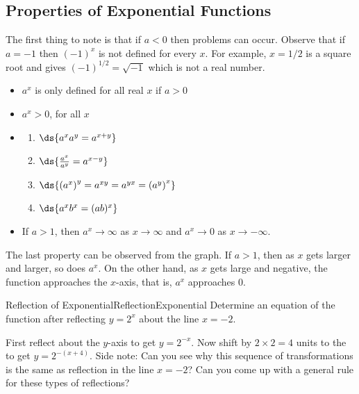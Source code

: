 \subsection*{Properties of Exponential Functions}
The first thing to note is that if $a<0$ then problems can occur.
Observe that if $a=-1$ then $(-1)^x$ is not defined for every $x$.
For example, $x=1/2$ is a square root and gives $(-1)^{1/2}=\sqrt{-1}$ which is not a real number.

\begin{formulabox}
\begin{itemize}
\item {} $a^x$ is only defined for all real $x$ if $a>0$
\item {} $a^x>0$, for all $x$
\item {}
\begin{multicols}{2}
\begin{enumerate}
	\item $\ds{a^xa^y=a^{x+y}}$
	\item $\ds{\frac{a^x}{a^y}=a^{x-y}}$
	\item $\ds{\left(a^x\right)^y=a^{xy}=a^{yx}=\left(a^y\right)^x}$
	\item $\ds{a^xb^x=(ab)^x}$
\end{enumerate}
\end{multicols}
\item {} If $a>1$, then $a^x\to\infty$ as $x\to\infty$ and $a^x\to 0$ as $x\to-\infty$.
\end{itemize}
\end{formulabox}

The last property can be observed from the graph. If $a>1$, then as $x$ gets larger and larger, so does $a^x$.
On the other hand, as $x$ gets large and negative, the function approaches the $x$-axis, that is, $a^x$ approaches $0$.

\begin{example}{Reflection of Exponential}{ReflectionExponential}
Determine an equation of the function after reflecting $y=2^x$ about the line $x=-2$.
\end{example}

\begin{solution} 
First reflect about the $y$-axis to get $y=2^{-x}$.
Now shift by $2\times 2=4$ units to the  to get $y=2^{-(x+4)}$.
Side note: Can you see why this sequence of transformations is the same as reflection in the line $x=-2$?
Can you come up with a general rule for these types of reflections?
\end{solution}

